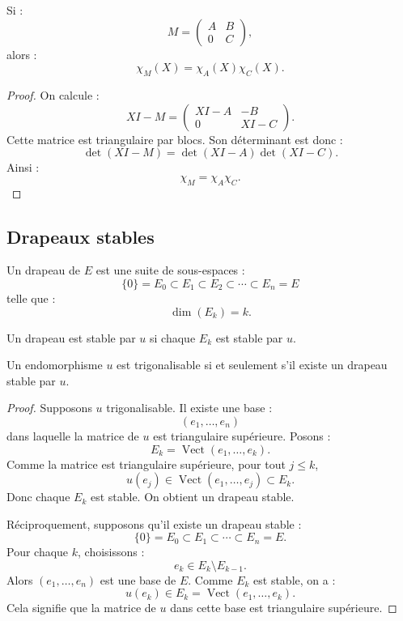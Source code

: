 \documentclass[11pt,a4paper]{article}
\newcommand{\Vect}{\operatorname{Vect}}
\begin{document}
\begin{theorembox}
Si :
\[
M=
\begin{pmatrix}
A&B\\
0&C
\end{pmatrix},
\]
alors :
\[
\chi_M(X)=\chi_A(X)\chi_C(X).
\]
\end{theorembox}

\begin{proof}
On calcule :
\[
XI-M=
\begin{pmatrix}
XI-A&-B\\
0&XI-C
\end{pmatrix}.
\]
Cette matrice est triangulaire par blocs.  
Son déterminant est donc :
\[
\det(XI-M)=\det(XI-A)\det(XI-C).
\]
Ainsi :
\[
\chi_M=\chi_A\chi_C.
\]
\end{proof}

\subsection{Drapeaux stables}

\begin{definitionbox}[Drapeau]
Un drapeau de \(E\) est une suite de sous-espaces :
\[
\{0\}=E_0\subset E_1\subset E_2\subset\cdots\subset E_n=E
\]
telle que :
\[
\dim(E_k)=k.
\]
\end{definitionbox}

\begin{definitionbox}
Un drapeau est stable par \(u\) si chaque \(E_k\) est stable par \(u\).
\end{definitionbox}

\begin{theorembox}
Un endomorphisme \(u\) est trigonalisable si et seulement s'il existe un drapeau stable par \(u\).
\end{theorembox}

\begin{proof}
Supposons \(u\) trigonalisable.  
Il existe une base :
\[
(e_1,\dots,e_n)
\]
dans laquelle la matrice de \(u\) est triangulaire supérieure.  
Posons :
\[
E_k=\Vect(e_1,\dots,e_k).
\]
Comme la matrice est triangulaire supérieure, pour tout \(j\leq k\),
\[
u(e_j)\in\Vect(e_1,\dots,e_j)\subset E_k.
\]
Donc chaque \(E_k\) est stable.  
On obtient un drapeau stable.

Réciproquement, supposons qu'il existe un drapeau stable :
\[
\{0\}=E_0\subset E_1\subset\cdots\subset E_n=E.
\]
Pour chaque \(k\), choisissons :
\[
e_k\in E_k\setminus E_{k-1}.
\]
Alors \((e_1,\dots,e_n)\) est une base de \(E\).  
Comme \(E_k\) est stable, on a :
\[
u(e_k)\in E_k=\Vect(e_1,\dots,e_k).
\]
Cela signifie que la matrice de \(u\) dans cette base est triangulaire supérieure.
\end{proof}
\end{document}
